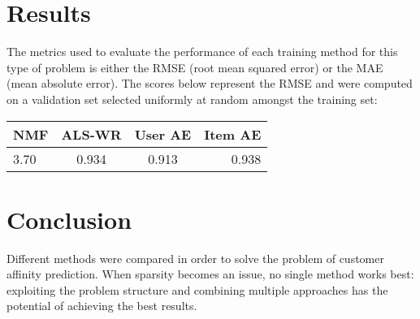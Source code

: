 \documentclass[10pt,twocolumn]{article}
\begin{document}
\section{Results}
The metrics used to evaluate the performance of each training method for this type of problem is either the RMSE (root mean squared error) or the MAE (mean absolute error). The scores below represent the RMSE and were computed on a validation set selected uniformly at random amongst the training set:
\begin{tabular}{|l|c|c|r|}
  \hline
  NMF & ALS-WR & User AE & Item AE \\
  \hline
  3.70 & 0.934 & 0.913 & 0.938 \\
  \hline
\end{tabular}


\section{Conclusion}
Different methods were compared in order to solve the problem of customer affinity prediction. When sparsity becomes an issue, no single method works best: exploiting the problem structure and combining multiple approaches has the potential of achieving the best results.


\end{document}
